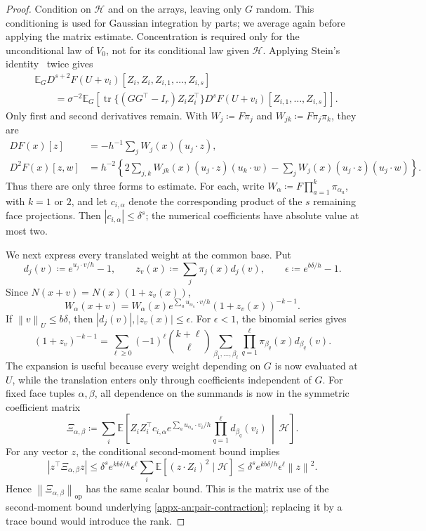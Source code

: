 \documentclass[11pt,letterpaper]{article}
\theoremstyle{remark}
\newcommand{\E}{\mathbb E}
\newcommand{\tr}{\operatorname{tr}}
\newcommand{\op}{\mathrm{op}}
\newcommand{\norm}[1]{\left\lVert#1\right\rVert}
\begin{document}
\begin{proof}
Condition on \(\mathcal H\) and on the arrays, leaving only \(G\)
random. This conditioning is used for Gaussian integration by parts;
we average again before applying the matrix estimate. Concentration
is required only for the unconditional law of \(V_0\), not for its
conditional law given \(\mathcal H\). Applying Stein's
identity~\cite{Stein1981} twice gives
\begin{align*}
 &\E_G D^{s+2}F(U+v_i)[Z_i,Z_i,Z_{i,1},\ldots,Z_{i,s}]\\
 &\qquad=\sigma^{-2}\E_G\left[
       \tr\{(GG^\top-I_r)Z_iZ_i^\top\}
       D^sF(U+v_i)[Z_{i,1},\ldots,Z_{i,s}]\right].
\end{align*}
Only first and second derivatives remain. With
\(W_j\coloneqq F\pi_j\) and \(W_{jk}\coloneqq F\pi_j\pi_k\), they are
\begin{align*}
 DF(x)[z]&=-h^{-1}\sum_jW_j(x)(u_j\cdot z),\\
 D^2F(x)[z,w]&=h^{-2}\left\{
       2\sum_{j,k}W_{jk}(x)(u_j\cdot z)(u_k\cdot w)
       -\sum_jW_j(x)(u_j\cdot z)(u_j\cdot w)\right\}.
\end{align*}
Thus there are only three forms to estimate. For each, write
\(W_\alpha\coloneqq F\prod_{a=1}^k\pi_{\alpha_a}\), with \(k=1\) or \(2\),
and let \(c_{i,\alpha}\) denote the corresponding product of the
\(s\) remaining face projections. Then \(|c_{i,\alpha}|\le\delta^s\);
the numerical coefficients have absolute value at most two.

We next express every translated weight at the common base. Put
\[
 d_j(v)\coloneqq e^{u_j\cdot v/h}-1,\qquad
 z_v(x)\coloneqq \sum_j\pi_j(x)d_j(v),\qquad
 \epsilon\coloneqq e^{b\delta/h}-1.
\]
Since \(N(x+v)=N(x)(1+z_v(x))\),
\begin{equation}
 W_\alpha(x+v)=W_\alpha(x)
 e^{\sum_a u_{\alpha_a}\cdot v/h}(1+z_v(x))^{-k-1}.
 \label{eq:weight-translation}
\end{equation}
If \(\norm v_U\le b\delta\), then \(|d_j(v)|,|z_v(x)|\le\epsilon\).
For \(\epsilon<1\), the binomial series gives
\[
 (1+z_v)^{-k-1}
 =\sum_{\ell\ge0}(-1)^\ell\binom{k+\ell}{\ell}
       \sum_{\beta_1,\ldots,\beta_\ell}
       \prod_{q=1}^\ell\pi_{\beta_q}(x)d_{\beta_q}(v).
\]
The expansion is useful because every weight depending on \(G\) is
now evaluated at \(U\), while the translation enters only through
coefficients independent of \(G\). For fixed face tuples \(\alpha,\beta\), all dependence on the
summands is now in the symmetric coefficient matrix
\[
 \Xi_{\alpha,\beta}\coloneqq \sum_i\E\left[
 Z_iZ_i^\top c_{i,\alpha}
 e^{\sum_a u_{\alpha_a}\cdot v_i/h}
 \prod_{q=1}^\ell d_{\beta_q}(v_i)\,\middle|\,\mathcal H\right].
\]
For any vector \(z\), the conditional second-moment bound implies
\[
 |z^\top\Xi_{\alpha,\beta}z|
 \le\delta^s e^{kb\delta/h}\epsilon^\ell
       \sum_i\E[(z\cdot Z_i)^2\mid\mathcal H]
 \le\delta^s e^{kb\delta/h}\epsilon^\ell\norm z^2.
\]
Hence \(\norm{\Xi_{\alpha,\beta}}_\op\) has the same scalar bound.
This is the matrix use of the second-moment bound underlying
\eqref{appx-an:pair-contraction}; replacing it by a trace bound
would introduce the rank.


\end{proof}
\end{document}
